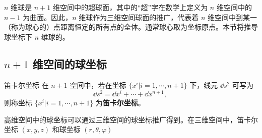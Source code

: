
$n$ 维球是 $n+1$ 维空间中的超球面，其中的“超”字在数学上定义为 $n$ 维空间中的 $n-1$ 为曲面。因此，$n$ 维球作为三维空间球面的推广，代表着 $n$ 维空间中到某一（称为球心的）点距离恒定的所有点的全体。通常球心取为坐标原点。本节将推导球坐标下 $n$ 维球的。

\subsection{$n+1$ 维空间的球坐标}
\begin{definition}{笛卡尔坐标}
在 $n+1$ 空间中，若在坐标 $\{x^i|i=1,\cdots,n+1\}$ 下，线元 $\dd s^2$ 可写为
\begin{equation}
\dd s^2=\dd x^i+\cdots+\dd x^{n+1},~
\end{equation}
 则称坐标 $\{x^i|i=1,\cdots,n+1\}$ 为\textbf{笛卡尔坐标}。
\end{definition}

高维空间中的球坐标可以通过三维空间的球坐标推广得到。在三维空间中，笛卡尔坐标 $(x,y,z)$ 和球坐标 $(r,\theta,\varphi)$











